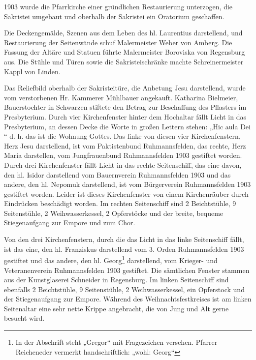 \documentclass[12pt,a4paper]{book}
\begin{document}
1903 wurde die Pfarrkirche einer gründlichen Restaurierung unterzogen,
die Sakristei umgebaut und oberhalb der Sakristei ein Oratorium
geschaffen.

Die Deckengemälde, Szenen aus dem Leben des hl. Laurentius darstellend,
und Restaurierung der Seitenwände schuf Malermeister Weber von Amberg.
Die Fassung der Altäre und Statuen führte Malermeister Boroviska von
Regensburg aus. Die Stühle und Türen sowie die Sakristeischränke machte
Schreinermeister Kappl von Linden.

Das Reliefbild oberhalb der Sakristeitüre, die Anbetung Jesu
darstellend, wurde vom verstorbenen Hr. Kammerer Mühlbauer angekauft.
Katharina Bielmeier, Bauerstochter in Schwarzen stiftete den Betrag zur
Beschaffung des Pflasters im Presbyterium. Durch vier Kirchenfenster
hinter dem Hochaltar fällt Licht in das Presbyterium, an dessen Decke
die Worte in großen Lettern stehen: „Hic aula Dei “ d. h. das ist die
Wohnung Gottes. Das linke von diesen vier Kirchenfenstern, Herz Jesu
darstellend, ist vom Paktistenbund Ruhmannsfelden, das rechte, Herz
Maria darstellen, vom Jungfrauenbund Ruhmannsfelden 1903 gestiftet
worden. Durch drei Kirchenfenster fällt Licht in das rechte
Seitenschiff, das eine davon, den hl. Isidor darstellend vom
Bauernverein Ruhmannsfelden 1903 und das andere, den hl. Nepomuk
darstellend, ist vom Bürgerverein Ruhmannsfelden 1903 gestiftet worden.
Leider ist dieses Kirchenfenster von einem Kirchenräuber durch
Eindrücken beschädigt worden. Im rechten Seitenschiff sind 2
Beichtstühle, 9 Seitenstühle, 2 Weihwasserkessel, 2 Opferstöcke und der
breite, bequeme Stiegenaufgang zur Empore und zum Chor.

Von den drei Kirchenfenstern, durch die das Licht in das linke
Seitenschiff fällt, ist das eine, den hl. Franziskus darstellend vom 3.
Orden Ruhmannsfelden 1903 gestiftet und das andere, den hl.
Georg\footnote{In der Abschrift steht „Gregor“ mit Fragezeichen
versehen. Pfarrer Reicheneder vermerkt handschriftlich: „wohl: Georg“}
darstellend, vom Krieger- und Veteranenverein Ruhmannsfelden 1903
gestiftet. Die sämtlichen Fenster stammen aus der Kunstglaserei
Schneider in Regensburg. Im linken Seitenschiff sind ebenfalls 2
Beichtstühle, 9 Seitenstühle, 2 Weihwasserkessel, ein Opferstock und der
Stiegenaufgang zur Empore. Während des Weihnachtsfestkreises ist am
linken Seitenaltar eine sehr nette Krippe angebracht, die von Jung und
Alt gerne besucht wird.
\end{document}
